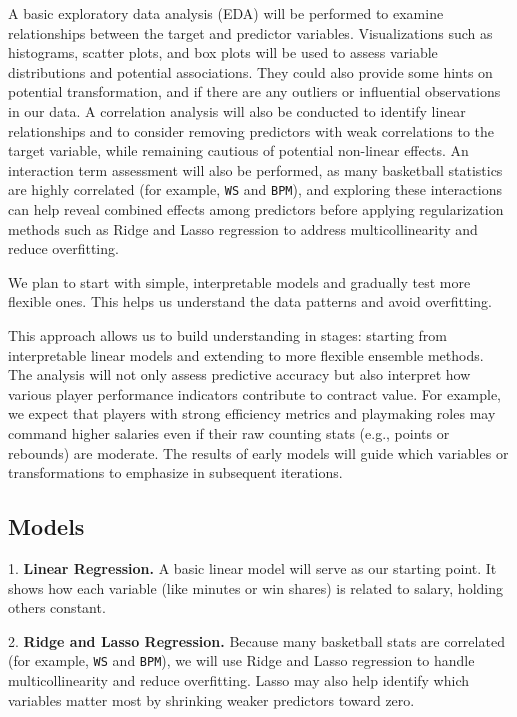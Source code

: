 \documentclass{article}
\theoremstyle{plain}
\theoremstyle{definition}
\theoremstyle{remark}
\begin{document}
A basic exploratory data analysis (EDA) will be performed to examine relationships between the target and predictor variables. Visualizations such as histograms, scatter plots, and box plots will be used to assess variable distributions and potential associations. They could also provide some hints on potential transformation, and if there are any outliers or influential observations in our data. A correlation analysis will also be conducted to identify linear relationships and to consider removing predictors with weak correlations to the target variable, while remaining cautious of potential non-linear effects. An interaction term assessment will also be performed, as many basketball statistics are highly correlated (for example, \texttt{WS} and \texttt{BPM}), and exploring these interactions can help reveal combined effects among predictors before applying regularization methods such as Ridge and Lasso regression to address multicollinearity and reduce overfitting. 

We plan to start with simple, interpretable models and gradually test more flexible ones. This helps us understand the data patterns and avoid overfitting.

This approach allows us to build understanding in stages: starting from interpretable linear models and extending to more flexible ensemble methods. The analysis will not only assess predictive accuracy but also interpret how various player performance indicators contribute to contract value. For example, we expect that players with strong efficiency metrics and playmaking roles may command higher salaries even if their raw counting stats (e.g., points or rebounds) are moderate. The results of early models will guide which variables or transformations to emphasize in subsequent iterations.

\subsection*{Models}

1. \textbf{Linear Regression.}  
A basic linear model will serve as our starting point. It shows how each variable (like minutes or win shares) is related to salary, holding others constant.

2. \textbf{Ridge and Lasso Regression.}  
Because many basketball stats are correlated (for example, \texttt{WS} and \texttt{BPM}), we will use Ridge and Lasso regression to handle multicollinearity and reduce overfitting. Lasso may also help identify which variables matter most by shrinking weaker predictors toward zero.
\end{document}
